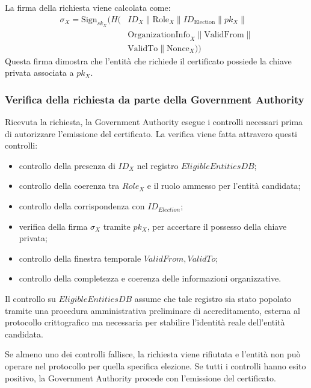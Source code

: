 \documentclass[a4paper,12pt]{article}
\begin{document}
La firma della richiesta viene calcolata come:
\begin{equation}
\begin{split}
	\sigma_X = \text{Sign}_{sk_X}\Big( H \big( & ID_X \parallel \text{Role}_X \parallel ID_{\text{Election}} \parallel pk_X \parallel \\
	& \text{OrganizationInfo}_X \parallel \text{ValidFrom} \parallel \\
	& \text{ValidTo} \parallel \text{Nonce}_X \big) \Big)
\end{split}
\end{equation}
Questa firma dimostra che l'entit\`a che richiede il certificato possiede la chiave privata associata a \(pk_X\).

\subsubsection{Verifica della richiesta da parte della Government Authority}

Ricevuta la richiesta, la Government Authority esegue i controlli necessari prima di autorizzare l'emissione del certificato. La verifica viene fatta attravero questi controlli:


\begin{itemize}
	\item controllo della presenza di \(ID_X\) nel registro \(EligibleEntitiesDB\);
	\item controllo della coerenza tra \(Role_X\) e il ruolo ammesso per l'entit\`a candidata;
	\item controllo della corrispondenza con \(ID_{Election}\);
	\item verifica della firma \(\sigma_X\) tramite \(pk_X\), per accertare il possesso della chiave privata;
	\item controllo della finestra temporale \(ValidFrom, ValidTo\);
	\item controllo della completezza e coerenza delle informazioni organizzative.
\end{itemize}

Il controllo su \(EligibleEntitiesDB\) assume che tale registro sia stato popolato tramite una procedura amministrativa preliminare di accreditamento, esterna al protocollo crittografico ma necessaria per stabilire l'identit\`a reale dell'entit\`a candidata.

Se almeno uno dei controlli fallisce, la richiesta viene rifiutata e l'entit\`a non pu\`o operare nel protocollo per quella specifica elezione. 
Se tutti i controlli hanno esito positivo, la Government Authority procede con l'emissione del certificato.
\end{document}
